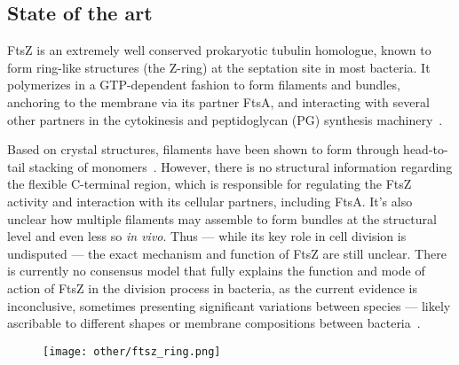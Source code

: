 \subsection{State of the art}


FtsZ is an extremely well conserved prokaryotic tubulin homologue, known to form ring-like structures (the Z-ring) at the septation site in most bacteria.
It polymerizes in a GTP-dependent fashion to form filaments and bundles, anchoring to the membrane via its partner FtsA, and interacting with several other partners in the cytokinesis and peptidoglycan (PG) synthesis machinery~\cite{barrowsFtsZDynamicsBacterial2021,mcquillenInsightsStructureFunction2020}.

Based on crystal structures, filaments have been shown to form through head-to-tail stacking of monomers~\cite{olivaStructuralInsightsFtsZ2004,barrowsFtsZDynamicsBacterial2021,mcquillenInsightsStructureFunction2020}.
However, there is no structural information regarding the flexible C-terminal region, which is responsible for regulating the FtsZ activity and interaction with its cellular partners, including FtsA.
It's also unclear how multiple filaments may assemble to form bundles at the structural level and even less so \textit{in vivo}.
Thus --- while its key role in cell division is undisputed --- the exact mechanism and function of FtsZ are still unclear.
There is currently no consensus model that fully explains the function and mode of action of FtsZ in the division process in bacteria, as the current evidence is inconclusive, sometimes presenting significant variations between species --- likely ascribable to different shapes or membrane compositions between bacteria~\cite{barrowsFtsZDynamicsBacterial2021,mcquillenInsightsStructureFunction2020}.

\begin{figure}
    \centering
    \texttt{[image: other/ftsz\_ring.png]}
    \label{fig:ftsz_ring}
\end{figure}


